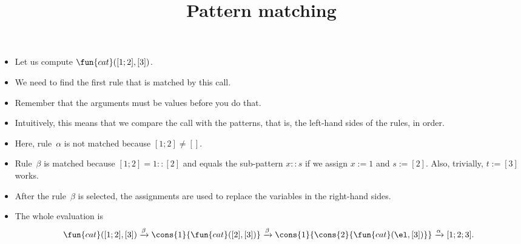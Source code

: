\documentclass[wide]{slides}
\begin{document}
\begin{slide}
  \title{Pattern matching}

  \begin{itemize}

    \item Let us compute \(\fun{cat}([1;2],[3])\).

    \item We need to find the first rule that is matched by this call.

    \item Remember that the arguments must be values before you do
      that.

    \item Intuitively, this means that we compare the call with the
      patterns, that is, the left\hyp{}hand sides of the rules, in
      order.

    \item Here, rule~\(\alpha\) is not matched because \([1;2] \neq
      []\).

    \item Rule~\(\beta\) is matched because \([1;2] = 1::[2]\) and
      equals the sub\hyp{}pattern \(x::s\) if we assign \(x := 1\) and
      \(s := [2]\). Also, trivially, \(t := [3]\) works.

    \item After the rule~\(\beta\) is selected, the assignments are
      used to replace the variables in the right\hyp{}hand sides.

    \item The whole evaluation is
    \begin{equation*}
      \fun{cat}([1;2],[3])
      \xrightarrow{\beta}
      \cons{1}{\fun{cat}([2],[3])}
      \xrightarrow{\beta}
      \cons{1}{\cons{2}{\fun{cat}(\el,[3])}}
      \xrightarrow{\alpha}
                    [1;2;3].
    \end{equation*}
  \end{itemize}

\end{slide}
\end{document}
